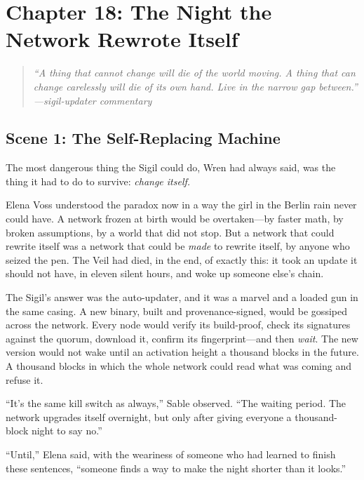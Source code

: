 \hypertarget{chapter-18-the-night-the-network-rewrote-itself}{%
\section{Chapter 18: The Night the Network Rewrote
Itself}\label{chapter-18-the-night-the-network-rewrote-itself}}

\begin{quote}
\itshape ``A thing that cannot change will die of the world moving. A thing that
can change carelessly will die of its own hand. Live in the narrow gap
between.''\\
\normalfont\hfill---sigil-updater commentary
\end{quote}

\hypertarget{scene-1-the-self-replacing-machine}{%
\subsection{Scene 1: The Self-Replacing
Machine}\label{scene-1-the-self-replacing-machine}}

The most dangerous thing the Sigil could do, Wren had always said, was the thing
it had to do to survive: \emph{change itself.}

Elena Voss understood the paradox now in a way the girl in the Berlin rain never
could have. A network frozen at birth would be overtaken---by faster math, by
broken assumptions, by a world that did not stop. But a network that could rewrite
itself was a network that could be \emph{made} to rewrite itself, by anyone who
seized the pen. The Veil had died, in the end, of exactly this: it took an update
it should not have, in eleven silent hours, and woke up someone else's chain.

The Sigil's answer was the auto-updater, and it was a marvel and a loaded gun in
the same casing. A new binary, built and provenance-signed, would be gossiped
across the network. Every node would verify its build-proof, check its
signatures against the quorum, download it, confirm its fingerprint---and then
\emph{wait}. The new version would not wake until an activation height a thousand
blocks in the future. A thousand blocks in which the whole network could read what
was coming and refuse it.

``It's the same kill switch as always,'' Sable observed. ``The waiting period. The
network upgrades itself overnight, but only after giving everyone a thousand-block
night to say no.''

``Until,'' Elena said, with the weariness of someone who had learned to finish
these sentences, ``someone finds a way to make the night shorter than it looks.''

